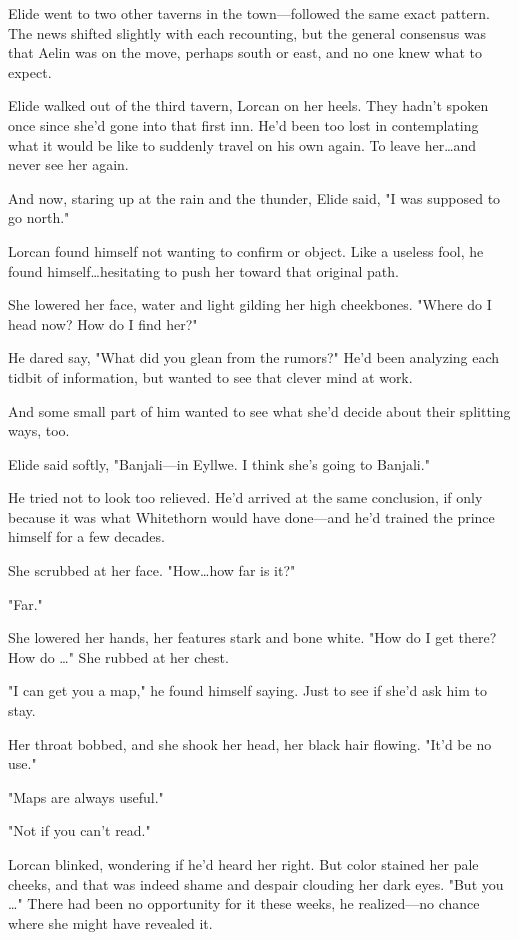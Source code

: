 Elide went to two other taverns in the town---followed the same exact pattern.
The news shifted slightly with each recounting, but the general consensus was that Aelin was on the move, perhaps south or east, and no one knew what to expect.

Elide walked out of the third tavern, Lorcan on her heels.
They hadn't spoken once since she'd gone into that first inn.
He'd been too lost in contemplating what it would be like to suddenly travel on his own again.
To leave her\ldots and never see her again.

And now, staring up at the rain and the thunder, Elide said, "I was supposed to go north."

Lorcan found himself not wanting to confirm or object.
Like a useless fool, he found himself\ldots hesitating to push her toward that original path.

She lowered her face, water and light gilding her high cheekbones.
"Where do I head now?
How do I find her?"

He dared say, "What did you glean from the rumors?"
He'd been analyzing each tidbit of information, but wanted to see that clever mind at work.

And some small part of him wanted to see what she'd decide about their splitting ways, too.

Elide said softly, "Banjali---in Eyllwe.
I think she's going to Banjali."

He tried not to look too relieved.
He'd arrived at the same conclusion, if only because it was what Whitethorn would have done---and he'd trained the prince himself for a few decades.

She scrubbed at her face.
"How\ldots how far is it?"

"Far."

She lowered her hands, her features stark and bone white.
"How do I get there?
How do \ldots" She rubbed at her chest.

"I can get you a map," he found himself saying.
Just to see if she'd ask him to stay.

Her throat bobbed, and she shook her head, her black hair flowing.
"It'd be no use."

"Maps are always useful."

"Not if you can't read."

Lorcan blinked, wondering if he'd heard her right.
But color stained her pale cheeks, and that was indeed shame and despair clouding her dark eyes.
"But you \ldots" There had been no opportunity for it these weeks, he realized---no chance where she might have revealed it.

